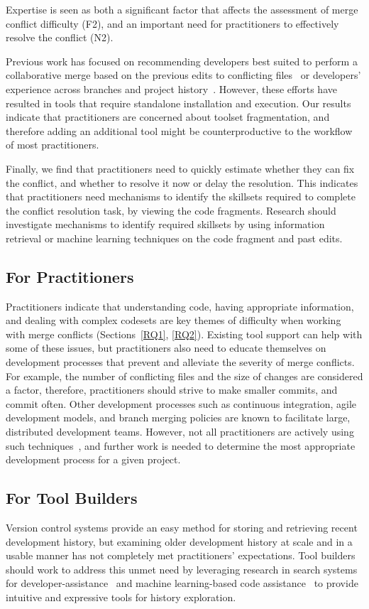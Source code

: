Expertise is seen as both a significant factor that affects the assessment of merge conflict difficulty (F2), and an important need for practitioners to effectively resolve the conflict (N2).

Previous work has focused on recommending developers best suited to perform a collaborative merge based on the previous edits to conflicting files~\cite{dasilva2015niche} or developers' experience across branches and project history~\cite{CostaSarma}. 
However, these efforts have resulted in tools that require standalone installation and execution. 
Our results indicate that practitioners are concerned about toolset fragmentation, and therefore adding an additional tool might be counterproductive to the workflow of most practitioners. 

Finally, we find that practitioners need to quickly estimate whether they can fix the conflict, and whether to resolve it now or delay the resolution. 
This indicates that practitioners need mechanisms to identify the skillsets required to complete the conflict resolution task, by viewing the code fragments.
Research should investigate mechanisms to identify required skillsets by using information retrieval or machine learning techniques on the code fragment and past edits.
\subsection{For Practitioners}
Practitioners indicate that understanding code, having appropriate information, and dealing with complex codesets are key themes of difficulty when working with merge conflicts (Sections~\ref{RQ1}, \ref{RQ2}).
Existing tool support can help with some of these issues, but practitioners also need to educate themselves on development processes that prevent and alleviate the severity of merge conflicts. For example, the number of conflicting files and the size of changes are considered a factor, therefore, practitioners should strive to make smaller commits, and commit often.
Other development processes such as continuous integration, agile development models, and branch merging policies are known to facilitate large, distributed development teams. 
However, not all practitioners are actively using such techniques~\cite{phillips2011branching}, and further work is needed to determine the most appropriate development process for a given project.
\subsection{For Tool Builders}
Version control systems provide an easy method for storing and retrieving recent development history, but examining older development history at scale and in a usable manner has not completely met practitioners' expectations.
Tool builders should work to address this unmet need by leveraging research in search systems for developer-assistance~\cite{nabi2016putting} and machine learning-based code assistance~\cite{bradley2011history_exploration} to provide intuitive and expressive tools for history exploration.

